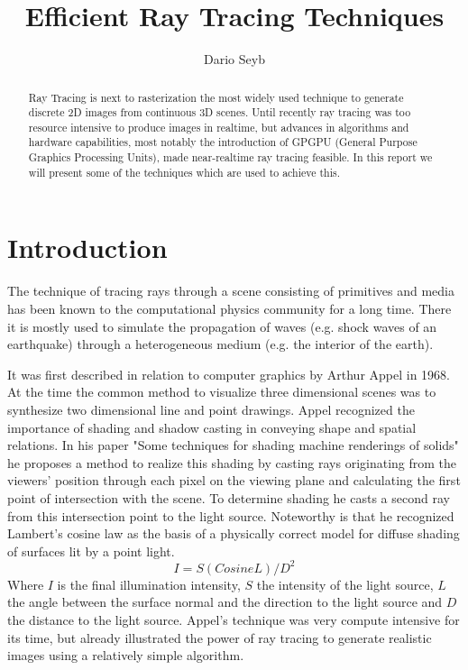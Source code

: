 \documentclass{ACGSeminar}
\begin{document}
\title{Efficient Ray Tracing Techniques}

\author{Dario Seyb}

\maketitle


\begin{abstract}%
Ray Tracing is next to rasterization the most widely used technique to generate discrete 2D images from continuous 3D scenes. Until recently ray tracing was too resource intensive to produce images in realtime, but advances in algorithms and hardware capabilities, most notably the introduction of GPGPU (General Purpose Graphics Processing Units), made near-realtime ray tracing feasible. In this report we will present some of the techniques which are used to achieve this.
\end{abstract}

\tableofcontents


\section{Introduction}
The technique of tracing rays through a scene consisting of primitives and media has been known to the computational physics community for a long time. There it is mostly used to simulate the propagation of waves (e.g. shock waves of an earthquake) through a heterogeneous medium (e.g. the interior of the earth). \cite{GJI:GJI93}

It was first described in relation to computer graphics by Arthur Appel in 1968. At the time the common method to visualize three dimensional scenes was to synthesize two dimensional line and point drawings. Appel recognized the importance of shading and shadow casting in conveying shape and spatial relations. In his paper "Some techniques for shading machine renderings of solids" he proposes a method to realize this shading by casting rays originating from the viewers' position through each pixel on the viewing plane and calculating the first point of intersection with the scene. To determine shading he casts a second ray from this intersection point to the light source. Noteworthy is that he recognized Lambert's cosine law as the basis of a physically correct model for diffuse shading of surfaces lit by a point light.
\begin{equation}
I = S (Cosine L)/D^{2}
\end{equation}
Where $I$ is the final illumination intensity, $S$ the intensity of the light source, $L$ the angle between the surface normal and the direction to the light source and $D$ the distance to the light source.
Appel's technique was very compute intensive for its time, but already illustrated the power of ray tracing to generate realistic images using a relatively simple algorithm. \cite{Appel68}
\end{document}
